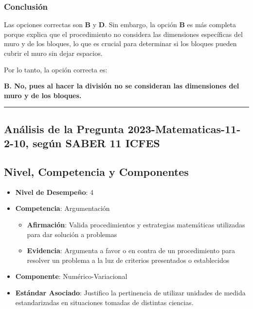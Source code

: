\documentclass[
]{article}
\providecommand{\tightlist}{%
  \setlength{\itemsep}{0pt}\setlength{\parskip}{0pt}}
\begin{document}
\subsubsection{Conclusión}\label{conclusiuxf3n-8}

Las opciones correctas son \textbf{B} y \textbf{D}. Sin embargo, la
opción \textbf{B} es más completa porque explica que el procedimiento no
considera las dimensiones específicas del muro y de los bloques, lo que
es crucial para determinar si los bloques pueden cubrir el muro sin
dejar espacios.

Por lo tanto, la opción correcta es:

\textbf{B. No, pues al hacer la división no se consideran las
dimensiones del muro y de los bloques.}

\begin{center}\rule{0.5\linewidth}{0.5pt}\end{center}

\subsection{Análisis de la Pregunta 2023-Matematicas-11-2-10, según
SABER 11
ICFES}\label{anuxe1lisis-de-la-pregunta-2023-matematicas-11-2-10-seguxfan-saber-11-icfes}

\subsection{Nivel, Competencia y
Componentes}\label{nivel-competencia-y-componentes}

\begin{itemize}
\tightlist
\item
  \textbf{Nivel de Desempeño}: 4
\item
  \textbf{Competencia}: Argumentación

  \begin{itemize}
  \tightlist
  \item
    \textbf{Afirmación}: Valida procedimientos y estrategias matemáticas
    utilizadas para dar solución a problemas
  \item
    \textbf{Evidencia}: Argumenta a favor o en contra de un
    procedimiento para resolver un problema a la luz de criterios
    presentados o establecidos
  \end{itemize}
\item
  \textbf{Componente}: Numérico-Variacional
\item
  \textbf{Estándar Asociado}: Justifico la pertinencia de utilizar
  unidades de medida estandarizadas en situaciones tomadas de distintas
  ciencias.
\end{itemize}
\end{document}

